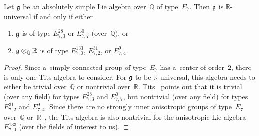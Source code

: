 \begin{prop}
Let $\Lie G$ be an absolutely simple Lie algebra over~$\mathbb{Q}$ of type~$E_7$.
Then $\Lie G$ is $\mathbb{R}$-universal if and only if either
\renewcommand{\labelenumi}{{\rm (\theenumi)}}
\begin{enumerate}\itemsep=0pt
\item $\Lie G$ is of type $E^{28}_{7,3}$ or $E^0_{7,7}$ $($over~$\mathbb{Q})$, or
\item $\Lie G \otimes_\mathbb{Q} \mathbb{R}$ is of type $E^{133}_{7,0}$, $E^{31}_{7,2}$, or $E^9_{7,4}$.
\end{enumerate}
\end{prop}

\begin{proof}
Since a~simply connected group of type~$E_7$ has a~center of order~$2$, there is only one Tits algebra to consider.
For $\Lie G$ to be $\mathbb{R}$-universal, this algebra needs to either be trivial over~$\mathbb{Q}$ or nontrivial
over~$\mathbb{R}$.
Tits~\cite[\S~6.5.5]{Tits-RepLinIrred} points out that it is trivial (over any f\/ield) for types $E^{28}_{7,3}$ and
$E^0_{7,7}$, but nontrivial (over any f\/ield) for types $E^{31}_{7,2}$ and $E^9_{7,4}$.
Since there are no strongly inner anisotropic groups of type~$E_7$ over~$\mathbb{Q}$ or~$\mathbb{R}$~\cite[Propositions~4
and~5]{Tits-StronglyInner}, the Tits algebra is also nontrivial for the anisotropic Lie algebra $E^{133}_{7,0}$ (over
the f\/ields of interest to us).
\end{proof}

